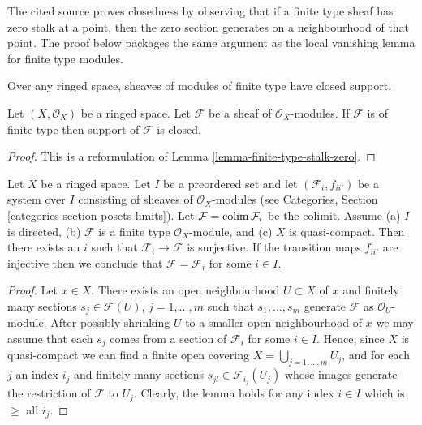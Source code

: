 \begin{lemma}
\label{lemma-support-finite-type-closed}
\begin{reference}
\cite[Chapter III, \S 6, no. 81, opening paragraph, p. 276]{FAC}
\end{reference}
\begin{history}
The cited source proves closedness by observing that if a finite type sheaf
has zero stalk at a point, then the zero section generates on a neighbourhood
of that point. The proof below packages the same argument as the local
vanishing lemma for finite type modules.
\end{history}
\begin{slogan}
Over any ringed space, sheaves of modules of finite type have closed support.
\end{slogan}
Let $(X, \mathcal{O}_X)$ be a ringed space.
Let $\mathcal{F}$ be a sheaf of $\mathcal{O}_X$-modules.
If $\mathcal{F}$ is of finite type then support of $\mathcal{F}$ is closed.
\end{lemma}

\begin{proof}
This is a reformulation of Lemma \ref{lemma-finite-type-stalk-zero}.
\end{proof}

\begin{lemma}
\label{lemma-finite-type-quasi-compact-colimit}
Let $X$ be a ringed space. Let $I$ be a preordered set and
let $(\mathcal{F}_i, f_{ii'})$ be a system over $I$ consisting of sheaves
of $\mathcal{O}_X$-modules (see
Categories, Section \ref{categories-section-posets-limits}).
Let $\mathcal{F} = \mathop{\mathrm{colim}}\nolimits \mathcal{F}_i$ be the colimit. Assume
(a) $I$ is directed,
(b) $\mathcal{F}$ is a finite type $\mathcal{O}_X$-module, and
(c) $X$ is quasi-compact. Then there exists an $i$ such that
$\mathcal{F}_i \to \mathcal{F}$ is surjective.
If the transition maps $f_{ii'}$ are injective
then we conclude that $\mathcal{F} = \mathcal{F}_i$ for some $i \in I$.
\end{lemma}

\begin{proof}
Let $x \in X$. There exists an open neighbourhood
$U \subset X$ of $x$ and finitely many sections
$s_j \in \mathcal{F}(U)$, $j = 1, \ldots, m$ such that
$s_1, \ldots, s_m$ generate $\mathcal{F}$ as $\mathcal{O}_U$-module.
After possibly shrinking $U$ to a smaller open neighbourhood of $x$
we may assume that each $s_j$ comes from a section of $\mathcal{F}_i$
for some $i \in I$.
Hence, since $X$ is quasi-compact we can find a finite open
covering $X = \bigcup_{j = 1, \ldots, m} U_j$, and for each $j$
an index $i_j$ and finitely many sections $s_{jl} \in \mathcal{F}_{i_j}(U_j)$
whose images generate the restriction of $\mathcal{F}$ to
$U_j$. Clearly, the lemma holds for any index $i \in I$ which
is $\geq$ all $i_j$.
\end{proof}


